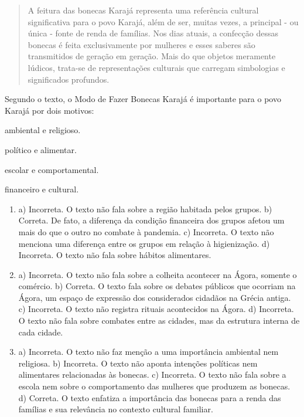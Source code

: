 \begin{quote}
A feitura das bonecas Karajá representa uma referência cultural significativa para o povo Karajá, além de ser, muitas vezes, a principal - ou única - fonte de renda de famílias. Nos dias atuais, a confecção dessas bonecas é feita exclusivamente por mulheres e esses saberes são transmitidos de geração em geração. Mais do que objetos meramente lúdicos, trata-se de representações culturais que carregam simbologias e significados profundos.
\end{quote}

Segundo o texto, o Modo de Fazer Bonecas Karajá é importante para o povo
Karajá por dois motivos:

\begin{minipage}{.5\textwidth}
\begin{escolha}
\item ambiental e religioso.

\item político e alimentar.

\item escolar e comportamental.

\item financeiro e cultural.
\end{escolha}
\end{minipage}


\begin{enumerate}

\item
a) Incorreta. O texto não fala sobre a região habitada pelos grupos.
b) Correta. De fato, a diferença da condição financeira dos grupos
afetou um mais do que o outro no combate à pandemia.
c) Incorreta. O texto não menciona uma diferença entre os grupos em relação à
higienização.
d) Incorreta. O texto não fala sobre hábitos alimentares.

\item
a) Incorreta. O texto não fala sobre a colheita acontecer na Ágora,
somente o comércio.
b) Correta. O texto fala sobre os debates públicos que ocorriam na
Ágora, um espaço de expressão dos considerados cidadãos na Grécia
antiga.
c) Incorreta. O texto não registra rituais acontecidos na Ágora.
d) Incorreta. O texto não fala sobre combates entre as cidades, mas da
estrutura interna de cada cidade.

\item
a) Incorreta. O texto não faz menção a uma importância ambiental nem
religiosa.
b) Incorreta. O texto não aponta intenções políticas nem alimentares
relacionadas às bonecas.
c) Incorreta. O texto não fala sobre a escola nem sobre o comportamento
das mulheres que produzem as bonecas.
d) Correta. O texto enfatiza a importância das bonecas para a renda das
famílias e sua relevância no contexto cultural familiar.
\end{enumerate}

